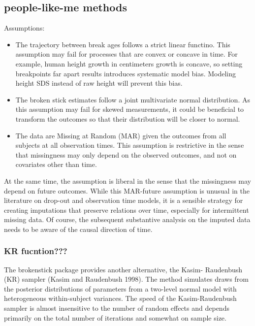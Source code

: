 \documentclass{article}
\begin{document}
\hypertarget{people-like-me-methods}{%
\subsection{people-like-me methods}\label{people-like-me-methods}}

Assumptions:

\begin{itemize}
\item
  The trajectory between break ages follows a strict linear functino.
  This assumption may fail for processes that are convex or concave in
  time. For example, human height growth in centimeters growth is
  concave, so setting breakpoints far apart results introduces
  systematic model bias. Modeling height SDS instead of raw height will
  prevent this bias.
\item
  The broken stick estimates follow a joint multivariate normal
  distribution. As this assumption may fail for skewed measurements, it
  could be beneficial to transform the outcomes so that their
  distribution will be closer to normal.
\item
  The data are Missing at Random (MAR) given the outcomes from all
  subjects at all observation times. This assumption is restrictive in
  the sense that missingness may only depend on the observed outcomes,
  and not on covariates other than time.
\end{itemize}

At the same time, the assumption is liberal in the sense that the
missingness may depend on future outcomes. While this MAR-future
assumption is unusual in the literature on drop-out and observation time
models, it is a sensible strategy for creating imputations that preserve
relations over time, especially for intermittent missing data. Of
course, the subsequent substantive analysis on the imputed data needs to
be aware of the causal direction of time.

\hypertarget{kr-fucntion}{%
\subsubsection{KR fucntion???}\label{kr-fucntion}}

The brokenstick package provides another alternative, the Kasim-
Raudenbush (KR) sampler (Kasim and Raudenbush 1998). The method
simulates draws from the posterior distributions of parameters from a
two-level normal model with heterogeneous within-subject variances. The
speed of the Kasim-Raudenbush sampler is almost insensitive to the
number of random effects and depends primarily on the total number of
iterations and somewhat on sample size.
\end{document}
